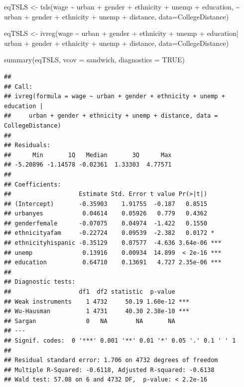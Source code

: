 \documentclass[
]{book}
\newenvironment{Shaded}{\begin{snugshade}}{\end{snugshade}}
\newcommand{\AttributeTok}[1]{\textcolor[rgb]{0.77,0.63,0.00}{#1}}
\newcommand{\ConstantTok}[1]{\textcolor[rgb]{0.00,0.00,0.00}{#1}}
\newcommand{\FunctionTok}[1]{\textcolor[rgb]{0.00,0.00,0.00}{#1}}
\newcommand{\NormalTok}[1]{#1}
\newcommand{\OtherTok}[1]{\textcolor[rgb]{0.56,0.35,0.01}{#1}}
\newcommand{\SpecialCharTok}[1]{\textcolor[rgb]{0.00,0.00,0.00}{#1}}
\theoremstyle{definition}
\theoremstyle{definition}
\theoremstyle{definition}
\theoremstyle{definition}
\theoremstyle{remark}
\begin{document}
\begin{Shaded}
\begin{Highlighting}[]
\NormalTok{eqTSLS }\OtherTok{\textless{}{-}} \FunctionTok{tsls}\NormalTok{(wage }\SpecialCharTok{\textasciitilde{}}\NormalTok{ urban }\SpecialCharTok{+}\NormalTok{ gender }\SpecialCharTok{+}\NormalTok{ ethnicity }\SpecialCharTok{+}\NormalTok{ unemp }\SpecialCharTok{+}\NormalTok{ education,}
               \SpecialCharTok{\textasciitilde{}}\NormalTok{ urban }\SpecialCharTok{+}\NormalTok{ gender }\SpecialCharTok{+}\NormalTok{ ethnicity }\SpecialCharTok{+}\NormalTok{ unemp }\SpecialCharTok{+}\NormalTok{ distance,}
               \AttributeTok{data=}\NormalTok{CollegeDistance)}

\NormalTok{eqTSLS }\OtherTok{\textless{}{-}} \FunctionTok{ivreg}\NormalTok{(wage }\SpecialCharTok{\textasciitilde{}}\NormalTok{ urban }\SpecialCharTok{+}\NormalTok{ gender }\SpecialCharTok{+}\NormalTok{ ethnicity }\SpecialCharTok{+}\NormalTok{ unemp }\SpecialCharTok{+}\NormalTok{ education}\SpecialCharTok{|}
\NormalTok{                  urban }\SpecialCharTok{+}\NormalTok{ gender }\SpecialCharTok{+}\NormalTok{ ethnicity }\SpecialCharTok{+}\NormalTok{ unemp }\SpecialCharTok{+}\NormalTok{ distance,}
                \AttributeTok{data=}\NormalTok{CollegeDistance)}

\FunctionTok{summary}\NormalTok{(eqTSLS, }\AttributeTok{vcov =}\NormalTok{ sandwich, }\AttributeTok{diagnostics =} \ConstantTok{TRUE}\NormalTok{)}
\end{Highlighting}
\end{Shaded}

\begin{verbatim}
## 
## Call:
## ivreg(formula = wage ~ urban + gender + ethnicity + unemp + education | 
##     urban + gender + ethnicity + unemp + distance, data = CollegeDistance)
## 
## Residuals:
##      Min       1Q   Median       3Q      Max 
## -5.20896 -1.14578 -0.02361  1.33303  4.77571 
## 
## Coefficients:
##                   Estimate Std. Error t value Pr(>|t|)    
## (Intercept)       -0.35903    1.91755  -0.187   0.8515    
## urbanyes           0.04614    0.05926   0.779   0.4362    
## genderfemale      -0.07075    0.04974  -1.422   0.1550    
## ethnicityafam     -0.22724    0.09539  -2.382   0.0172 *  
## ethnicityhispanic -0.35129    0.07577  -4.636 3.64e-06 ***
## unemp              0.13916    0.00934  14.899  < 2e-16 ***
## education          0.64710    0.13691   4.727 2.35e-06 ***
## 
## Diagnostic tests:
##                   df1  df2 statistic  p-value    
## Weak instruments    1 4732     50.19 1.60e-12 ***
## Wu-Hausman          1 4731     40.30 2.38e-10 ***
## Sargan              0   NA        NA       NA    
## ---
## Signif. codes:  0 '***' 0.001 '**' 0.01 '*' 0.05 '.' 0.1 ' ' 1
## 
## Residual standard error: 1.706 on 4732 degrees of freedom
## Multiple R-Squared: -0.6118, Adjusted R-squared: -0.6138 
## Wald test: 57.08 on 6 and 4732 DF,  p-value: < 2.2e-16
\end{verbatim}
\end{document}
